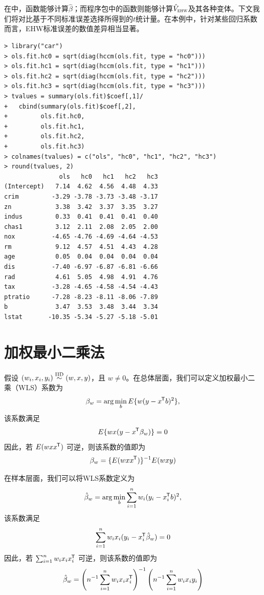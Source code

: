在中，函数能够计算$\hat{\beta}$；而程序包中的函数则能够计算$\hat{V}_\textsc{ehw} $及其各种变体。下文我们将对比基于不同标准误差选择所得到的$t$统计量。在本例中，针对某些回归系数而言，EHW标准误差的数值差异相当显著。 

\begin{lstlisting}
> library("car")
> ols.fit.hc0 = sqrt(diag(hccm(ols.fit, type = "hc0")))
> ols.fit.hc1 = sqrt(diag(hccm(ols.fit, type = "hc1")))
> ols.fit.hc2 = sqrt(diag(hccm(ols.fit, type = "hc2")))
> ols.fit.hc3 = sqrt(diag(hccm(ols.fit, type = "hc3")))
> tvalues = summary(ols.fit)$coef[,1]/
+   cbind(summary(ols.fit)$coef[,2], 
+         ols.fit.hc0, 
+         ols.fit.hc1, 
+         ols.fit.hc2, 
+         ols.fit.hc3)
> colnames(tvalues) = c("ols", "hc0", "hc1", "hc2", "hc3")
> round(tvalues, 2)
               ols   hc0   hc1   hc2   hc3
(Intercept)   7.14  4.62  4.56  4.48  4.33
crim         -3.29 -3.78 -3.73 -3.48 -3.17
zn            3.38  3.42  3.37  3.35  3.27
indus         0.33  0.41  0.41  0.41  0.40
chas1         3.12  2.11  2.08  2.05  2.00
nox          -4.65 -4.76 -4.69 -4.64 -4.53
rm            9.12  4.57  4.51  4.43  4.28
age           0.05  0.04  0.04  0.04  0.04
dis          -7.40 -6.97 -6.87 -6.81 -6.66
rad           4.61  5.05  4.98  4.91  4.76
tax          -3.28 -4.65 -4.58 -4.54 -4.43
ptratio      -7.28 -8.23 -8.11 -8.06 -7.89
b             3.47  3.53  3.48  3.44  3.34
lstat       -10.35 -5.34 -5.27 -5.18 -5.01
\end{lstlisting}




\section{加权最小二乘法}
\label{sec::appendix-wls}


假设 $(w_i, x_i, y_i) \stackrel{\textup{IID}}{\sim} (w, x, y)$，且 $w\neq 0$。在总体层面，我们可以定义加权最小二乘（WLS）系数为
$$
\beta_w = \arg\min_b  E\{  w (y-x ^{\mkern-1.5mu\mathsf{T}} b)^{2}    \},
$$
该系数满足
$$
E  \{  w x (y-x ^{\mkern-1.5mu\mathsf{T}} \beta_w ) \} = 0
$$
因此，若 $E  ( w xx^{\mkern-1.5mu\mathsf{T}} )$ 可逆，则该系数的值即为
$$
\beta_w  = \{  E  ( w xx^{\mkern-1.5mu\mathsf{T}} ) \}^{-1} E(  w xy )
$$ 

在样本层面，我们可以将WLS系数定义为
$$
\hat{\beta}_w = \arg\min_b \sum_{i=1}^n w_i (y_i-x_i ^{\mkern-1.5mu\mathsf{T}} b)^{2},
$$
该系数满足
$$
\sum_{i=1}^n w_i x_i (y_i -x_i ^{\mkern-1.5mu\mathsf{T}} \hat\beta_w ) = 0
$$
因此，若 $\sum_{i=1}^n   w_i x_ix_i^{\mkern-1.5mu\mathsf{T}}$ 可逆，则该系数的值即为
$$
\hat \beta_w  =  \left(  n^{-1} \sum_{i=1}^n   w_i x_ix_i^{\mkern-1.5mu\mathsf{T}} \right)^{-1} \left(   n^{-1} \sum_{i=1}^n   w_i x_i y_i \right)
$$ 

